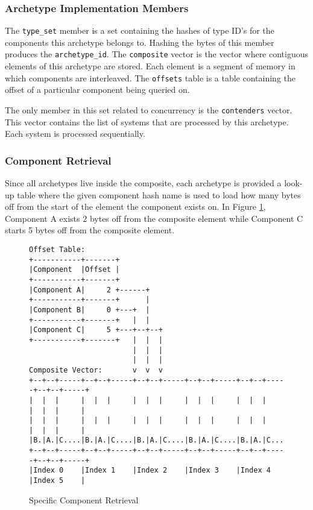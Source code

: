 \subsubsection{Archetype Implementation Members}
The \texttt{type\_set} member is a set containing the hashes of type ID's for the components this archetype belongs to. Hashing the bytes of this member produces the \texttt{archetype\_id}. The \texttt{composite} vector is the vector where contiguous elements of this archetype are stored. Each element is a segment of memory in which components are interleaved. The \texttt{offsets} table is a table containing the offset of a particular component being queried on.  

The only member in this set related to concurrency is the \texttt{contenders} vector. This vector contains the list of systems that are processed by this archetype. Each system is processed sequentially. 

\subsubsection{Component Retrieval}
Since all archetypes live inside the composite, each archetype is provided a look-up table where the given component hash name is used to load how many bytes off from the start of the element the component exists on. In Figure \ref{code:component_retrieval}, Component A exists 2 bytes off from the composite element while Component C starts 5 bytes off from the composite element.

\begin{figure}[H]
\begin{verbatim}
Offset Table:                                                             
+-----------+-------+                                                     
|Component  |Offset |                                                     
+-----------+-------+                                                     
|Component A|     2 +------+                                              
+-----------+-------+      |                                              
|Component B|     0 +---+  |                                              
+-----------+-------+   |  |                                              
|Component C|     5 +---+--+--+                                           
+-----------+-------+   |  |  |                                           
                        |  |  |                                           
                        |  |  |                                           
Composite Vector:       v  v  v                                           
+--+--+-----+--+--+-----+--+--+-----+--+--+-----+--+--+-----+--+--+-----+ 
|  |  |     |  |  |     |  |  |     |  |  |     |  |  |     |  |  |     | 
|  |  |     |  |  |     |  |  |     |  |  |     |  |  |     |  |  |     | 
|B.|A.|C....|B.|A.|C....|B.|A.|C....|B.|A.|C....|B.|A.|C....|B.|A.|C....| 
+--+--+-----+--+--+-----+--+--+-----+--+--+-----+--+--+-----+--+--+-----+ 
|Index 0    |Index 1    |Index 2    |Index 3    |Index 4    |Index 5    | 
\end{verbatim}
\caption{Specific Component Retrieval}
\label{code:component_retrieval}
\end{figure}

